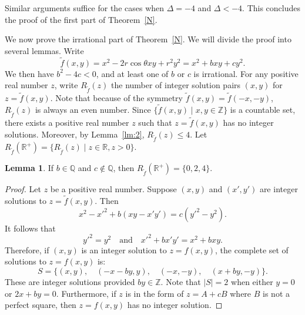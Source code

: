 \documentclass[11pt]{amsart}
\theoremstyle{definition}
\newtheorem{lemma}[theorem]{Lemma}
\begin{document}
    Similar arguments suffice for the cases when $\Delta = -4$ and $\Delta < -4$. This concludes the
    proof of the first part of Theorem~\ref{N}.

    We now prove the irrational part of Theorem~\ref{N}. We will divide the proof into several lemmas. Write
    $$
    \tilde f(x, y)=x^2-2r\cos\theta xy +r^2y^2=x^2+bxy+cy^2.
    $$
    We then have $b^2-4c<0$, and at least one of $b$ or $c$ is irrational.  For any positive real number $z$, write  $R_{\tilde{f}}(z)$ the number of integer solution pairs $(x, y)$ for $z=\tilde f(x, y)$.  Note that because of the symmetry $\tilde f(x, y)=\tilde f(-x, -y)$, $R_{\tilde{f}}(z)$ is always an even number. Since $\{\tilde f(x, y) \mid x, y\in \mathbb{Z}\}$ is a countable set, there exists a positive real number $z$ such that $z=\tilde f(x, y)$ has no integer solutions. Moreover, by Lemma~\ref{lm:2}, $R_{\tilde{f}}(z)\le 4$. Let $R_{\tilde{f}}(\mathbb{R^{+}})=\{R_{\tilde{f}}(z) \mid z\in\mathbb{R}, z>0\}$.

    \begin{lemma}\label{lm:a} If $b\in\mathbb{Q}$ and $c\not\in\mathbb{Q}$, then $R_{\tilde{f}}(\mathbb{R^{+}})=\{0, 2, 4\}$. 
    \end{lemma}
    \begin{proof} Let $z$ be a positive real number. Suppose $(x, y)$ and $(x', y')$ are integer solutions to $z=\tilde f(x, y)$. Then
    $$
    x^2-x'^2+b(xy-x'y')=c(y'^2-y^2).
    $$
    It follows that 
	\[
    y'^2 = y^2 \quad\text{and}\quad 
	x'^2 + bx'y' = x^2 + bxy.
    \]
Therefore, if $(x, y)$ is an integer solution to $z=f(x, y)$, the complete set of solutions to $z=f(x, y)$ is:
	\[ S = \{ (x, y), \quad (-x-by, y), \quad (-x, -y), \quad (x+by, -y) \}. \]
These are integer solutions provided $by\in \mathbb{Z}$. Note that $|S|=2$ when either $y=0$ or $2x+by=0$. Furthermore, 
    if $z$ is in the form of $z=A+cB$ where $B$ is not a perfect square, then $z=f(x, y)$ has no integer solution. \end{proof}
\end{document}
